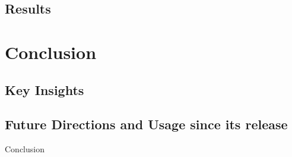 \documentclass[aspectratio=169,xcolor=dvipsnames]{beamer}
\begin{document}
\subsection{Results}


\section{Conclusion}

\subsection{Key Insights}

\subsection{Future Directions and Usage since its release}

\begin{frame}{Conclusion}

\end{frame}
\end{document}
